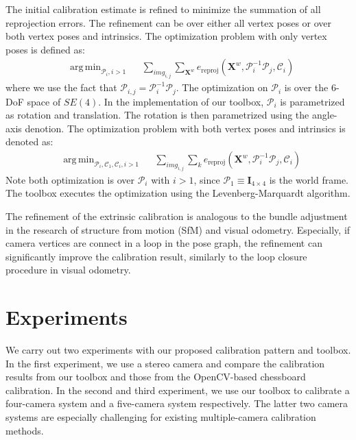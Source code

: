 \documentclass{report}
\DeclareMathOperator*{\argmin}{arg\,min}
\begin{document}
The initial calibration estimate is refined to minimize the summation of all reprojection errors. The refinement can be over either all vertex poses or over both vertex poses and intrinsics. The optimization problem with only vertex poses is defined as: 
\begin{equation}
\begin{aligned}
& \argmin_{\mathcal{P}_i, i > 1} & & \sum_{img_{i, j}} \sum_{\mathbf{X}^w} e_{\textrm{reproj}}(\mathbf{X}^w, \mathcal{P}_i^{-1} \mathcal{P}_j, \mathcal{C}_i) 
\end{aligned}
\end{equation}
where we use the fact that $\mathcal{P}_{i, j} = \mathcal{P}_i^{-1} \mathcal{P}_j$. The optimization on $\mathcal{P}_i$ is over the 6-DoF space of $SE(4)$. In the implementation of our toolbox, $\mathcal{P}_i$ is parametrized as rotation and translation. The rotation is then parametrized using the angle-axis denotion. 
The optimization problem with both vertex poses and intrinsics is denoted as: 
\begin{equation}
\begin{aligned}
& \argmin_{\mathcal{P}_i, \mathcal{C}_1, \mathcal{C}_i, i > 1} & & \sum_{img_{i, j}} \sum_{k} e_{\textrm{reproj}}(\mathbf{X}^w, \mathcal{P}_i^{-1} \mathcal{P}_j, \mathcal{C}_i)
\end{aligned}
\end{equation}
Note both optimization is over $\mathcal{P}_i$ with $i > 1$, since $\mathcal{P}_1 \equiv \mathbf{I}_{4 \times 4}$ is the world frame. The toolbox executes the optimization using the Levenberg-Marquardt algorithm. 

The refinement of the extrinsic calibration is analogous to the bundle adjustment in the research of structure from motion (SfM) and visual odometry. Especially, if camera vertices are connect in a loop in the pose graph, the refinement can significantly improve the calibration result, similarly to the loop closure procedure in visual odometry. 


\chapter{Experiments}
We carry out two experiments with our proposed calibration pattern and toolbox. In the first experiment, we use a stereo camera and compare the calibration results from our toolbox and those from the OpenCV-based chessboard calibration. In the second and third experiment, we use our toolbox to calibrate a four-camera system and a five-camera system respectively. The latter two camera systems are especially challenging for existing multiple-camera calibration methods. 
\end{document}

